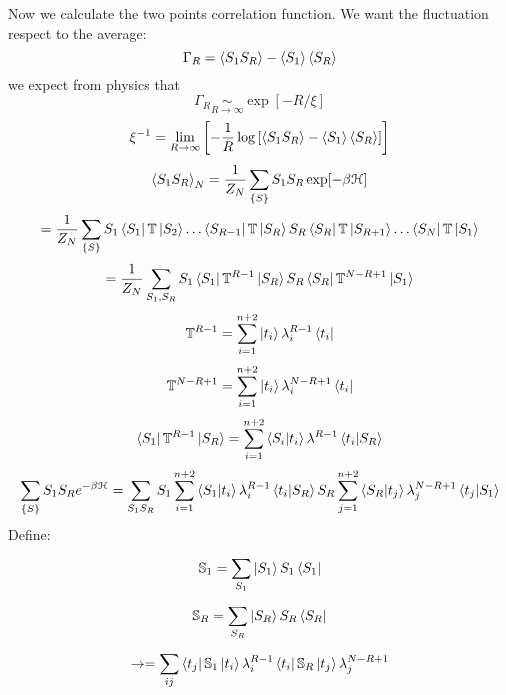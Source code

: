 \documentclass[../main/main.tex]{subfiles}
\begin{document}
Now we calculate the two points correlation function. We want the fluctuation respect to the average:
\begin{equation}
  \Gamma _R = \expval{S_1 S_R} - \expval{S_1}\expval{S_R}
\end{equation}
we expect from physics that
\begin{equation}
  \Gamma _R \underset{R \rightarrow \infty }{\sim } \exp [-R/\xi ]
\end{equation}
\begin{equation}
  \xi^{-1} = \lim_{R \rightarrow \infty } \qty[ - \frac{1}{R} \log{ \qty[ \expval{S_1 S_R} - \expval{S_1}\expval{S_R}] } ]
\end{equation}
\begin{equation}
  \expval{S_1 S_R}_N = \frac{1}{Z_N} \sum_{\{ S \}  }^{} S_1 S_R \exp [-\beta \mathcal{H}]
\end{equation}
\begin{equation}
  = \frac{1}{Z_N} \sum_{\{ S \}  }^{} S_1 \bra{S_1} \mathbb{T} \ket{S_2} \dots  \bra{S_{R-1}} \mathbb{T} \ket{S_R} S_R \bra{S_R} \mathbb{T} \ket{S_{R+1}} \dots \bra{S_N} \mathbb{T} \ket{S_1}
\end{equation}
\begin{equation}
  = \frac{1}{Z_N} \sum_{S_1,S_R}^{} S_1 \bra{S_1} \mathbb{T}^{R-1} \ket{S_R} S_R \bra{S_R} \mathbb{T}^{N-R+1} \ket{S_1}
\end{equation}
\begin{equation}
  \mathbb{T}^{R-1} = \sum_{i=1}^{n+2} \ket{t_i} \lambda _i^{R-1}  \bra{t_i}
\end{equation}
\begin{equation}
  \mathbb{T}^{N-R+1} = \sum_{i=1}^{n+2} \ket{t_i} \lambda _i^{N-R+1}  \bra{t_i}
\end{equation}
\begin{equation}
  \bra{S_1} \mathbb{T}^{R-1} \ket{S_R} = \sum_{i=1}^{n+2} \braket{S_i}{t_i} \lambda ^{R-1} \braket{t_i}{S_R}
\end{equation}
\begin{equation}
  \sum_{\{ S \}  }^{}  S_1 S_R e^{-\beta \mathcal{H}} = \sum_{S_1 S_R}^{} S_1 \sum_{i=1}^{n+2} \braket{S_1}{t_i} \lambda _i^{R-1} \braket{t_i}{S_R} S_R \sum_{j=1}^{n+2} \braket{S_R}{t_j} \lambda_j ^{N-R+1} \braket{t_j}{S_1}
\end{equation}
Define:
\begin{equation}
  \mathbb{S}_1 = \sum_{S_1}^{} \ket{S_1} S_1 \bra{S_1}
\end{equation}
\begin{equation}
\mathbb{S}_R = \sum_{S_R}^{} \ket{S_R} S_R \bra{S_R}
\end{equation}
\begin{equation}
  \rightarrow = \sum_{ij}^{} \bra{t_j } \mathbb{S}_1 \ket{t_i} \lambda _i^{R-1} \bra{t_i} \mathbb{S}_R \ket{t_j} \lambda _j ^{N-R+1}
\end{equation}
\end{document}
